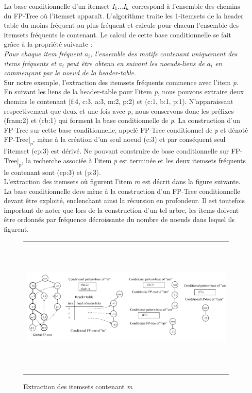\documentclass[a4paper,10pt]{report}
\begin{document}
La base conditionnelle d'un itemset $\emph{I}_{1}...\emph{I}_{k}$ correspond à l'ensemble des chemins du FP-Tree où l'itemset apparaît. L'algorithme traite les 1-itemsets de la header table du moins fréquent au plus fréquent et calcule pour chacun l'ensemble des itemsets fréquents le contenant. Le calcul de cette base conditionnelle se fait grâce à  la propriété suivante : \\

\emph{Pour chaque item fréquent $a_{i}$, l'ensemble des motifs contenant uniquement des items fréquents et $a_{i}$ peut être obtenu en suivant les noeuds-liens de $a_{i}$ en commençant par le noeud de la header-table.} \\

Sur notre exemple, l'extraction des itemsets fréquents commence avec l'item \emph{p}. En suivant les liens de la header-table pour l'item \emph{p}, nous pouvons extraire deux chemins le contenant (f:4, c:3, a:3, m:2, p:2) et (c:1, b:1, p:1). N'apparaissant respectivement que deux et une fois avec \emph{p}, nous conservons donc les préfixes (fcam:2) et (cb:1) qui forment la base conditionnelle de \emph{p}. La construction d'un FP-Tree sur cette base conditionnelle, appelé FP-Tree conditionnel de \emph{p} et dénoté FP-Tree$|_{p}$, mène à la création d'un seul noeud (c:3) et par conséquent  seul l'itemset (cp:3) est dérivé. Ne pouvant construire de base conditionnelle sur FP-Tree$|_{p}$, la recherche associée à l'item \emph{p} est terminée et les deux itemsets fréquents le contenant sont (cp:3) et (p:3). \\
L'extraction des itemsets où figurent l'item \emph{m} est décrit dans la figure suivante. La base conditionnelle de\emph{m} mène à la construction d'un FP-Tree conditionnelle devant être exploité, enclenchant ainsi la récursion en profondeur. Il est toutefois important de noter que lors de la construction d'un tel arbre, les items doivent être ordonnés par fréquence décroissante du nombre de noeuds dans lequel ils figurent.

\begin{figure}
	\begin{adjustwidth}{-1cm}{}
	\begin{tabular}{l}
	\includegraphics[width=15cm,height=7cm]{./img/mining_m}\\
	\end{tabular}
	\caption{\label{fig:text}Extraction des itemsets contenant \emph{m}}
	\end{adjustwidth}
\end{figure}
\end{document}
